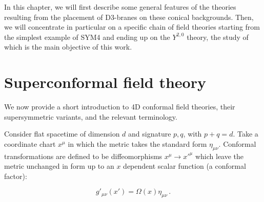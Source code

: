 In this chapter, we will first describe some general features of the theories resulting from the placement of D3-branes on these conical backgrounds. Then, we will concentrate in particular on a specific chain of field theories starting from the simplest example of SYM4 and ending up on the $Y^{2,0}$ theory, the study of which is the main objective of this work.

\section{Superconformal field theory}\label{sec:scft}

We now provide a short introduction to 4D conformal field theories, their supersymmetric variants, and the relevant terminology.

%
%
%

Consider flat spacetime of dimension $d$ and signature $p,q$, with $p+q = d$. Take a coordinate chart $x^\mu$ in which the metric takes the standard form $\eta_{\mu\nu}$. Conformal transformations are defined to be diffeomorphisms $x^\mu \rightarrow x'^\mu$ which leave the metric unchanged in form up to an $x$ dependent scalar function (a conformal factor):

\begin{equation}
	g'_{\mu\nu}(x') = \Omega(x) \eta_{\mu\nu}\,.
	\label{}
\end{equation}


